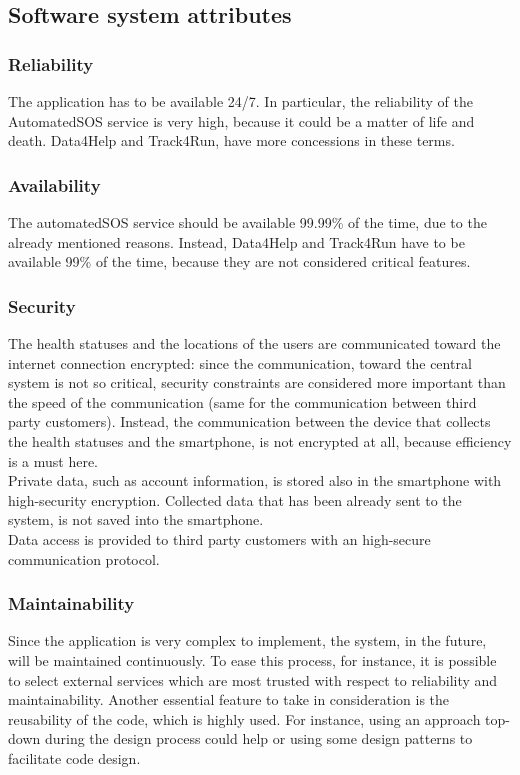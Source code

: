 \subsection{Software system attributes}
\subsubsection{Reliability}
The application has to be available 24/7. In particular, the reliability of the AutomatedSOS service is very high, because it could be a matter of life and death. Data4Help and Track4Run, have more concessions in these terms.

\subsubsection{Availability}
The automatedSOS service should be available 99.99\% of the time, due to the already mentioned reasons. Instead, Data4Help and Track4Run have to be available 99\% of the time, because they are not considered critical features.  

\subsubsection{Security}
The health statuses and the locations of the users are communicated toward the internet connection encrypted: since the communication, toward the central system is not so critical, security constraints are considered more important than the speed of the communication (same for the communication between third party customers). Instead, the communication between the device that collects the health statuses and the smartphone, is not encrypted at all, because efficiency is a must here. \\ 
Private data, such as account information, is stored also in the smartphone with high-security encryption. Collected data that has been already sent to the system, is not saved into the smartphone. \\
Data access is provided to third party customers with an high-secure communication protocol.

\subsubsection{Maintainability}
Since the application is very complex to implement, the system, in the future, will be maintained continuously. To ease this process, for instance, it is possible to select external services which are most trusted with respect to reliability and maintainability. Another essential feature to take in consideration is the reusability of the code, which is highly used. For instance, using an approach top-down during the design process could help or using some design patterns to facilitate code design.


